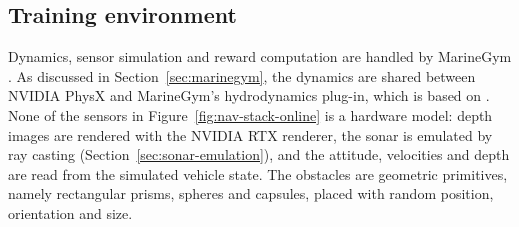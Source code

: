 \subsection{Training environment}
\label{sec:env}
Dynamics, sensor simulation and reward computation are handled by MarineGym \parencite{chu2025marinegym}. As discussed in Section~\ref{sec:marinegym}, the dynamics are shared between NVIDIA PhysX and MarineGym's hydrodynamics plug-in, which is based on \textcite{fossen2021handbook}. None of the sensors in Figure~\ref{fig:nav-stack-online} is a hardware model: depth images are rendered with the NVIDIA RTX renderer, the sonar is emulated by ray casting (Section~\ref{sec:sonar-emulation}), and the attitude, velocities and depth are read from the simulated vehicle state. The obstacles are geometric primitives, namely rectangular prisms, spheres and capsules, placed with random position, orientation and size.

